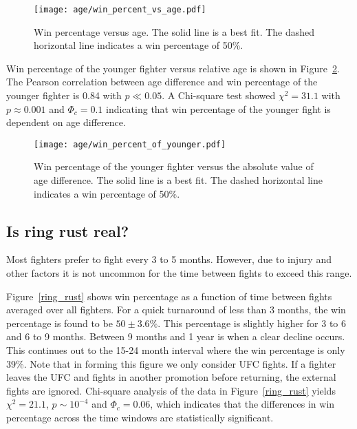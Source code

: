 \begin{figure}[h]
\begin{center}
\texttt{[image: age/win\_percent\_vs\_age.pdf]}
\caption{Win percentage versus age. The
solid line is a best fit. The dashed horizontal line indicates
a win percentage of 50\%.}
\label{win_pct_abs_age}
\end{center}
\end{figure}

Win percentage of the younger fighter versus relative age
is shown in Figure~\ref{win_pct_rel_age}.
The Pearson correlation between age difference and win percentage of the
younger fighter is 0.84 with $p \ll 0.05$. A Chi-square
test showed $\chi^2=31.1$ with $p \approx 0.001$ and $\Phi_c=0.1$ indicating that win percentage
of the younger fight is dependent on age difference.

\begin{figure}[h]
\begin{center}
\texttt{[image: age/win\_percent\_of\_younger.pdf]}
\caption{Win percentage of the younger fighter versus the absolute
value of age difference. The
solid line is a best fit. The dashed horizontal line indicates
a win percentage of 50\%.}
\label{win_pct_rel_age}
\end{center}
\end{figure}

\clearpage
\subsection*{Is ring rust real?}

Most fighters prefer to fight every 3 to 5 months. However, due to injury
and other factors
it is not uncommon
for the time between fights to exceed this range.

Figure~\ref{ring_rust} shows win percentage as a function
of time between fights averaged over all fighters.
For a quick turnaround of less than 3 months, the win percentage
is found to be $50\pm3.6\%$. This percentage is slightly
higher for 3 to 6 and 6 to 9 months.  Between 9 months
and 1 year is when a clear decline occurs. This continues
out to the 15-24 month interval where the win percentage
is only 39\%.
Note that in forming this figure we only consider UFC fights. If a fighter
leaves the UFC and fights in another promotion before returning, the
external fights are ignored. Chi-square analysis of the
data in Figure~\ref{ring_rust} yields
$\chi^2=21.1$, $p \sim 10^{-4}$ and $\Phi_c=0.06$, which
indicates that the differences in win percentage across the
time windows are statistically significant.

